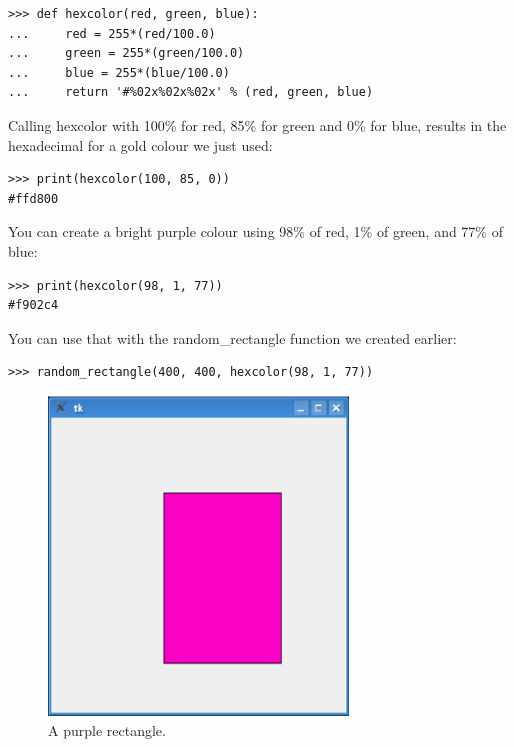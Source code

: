 \begin{listing}
\begin{verbatim}
>>> def hexcolor(red, green, blue):
...     red = 255*(red/100.0)
...     green = 255*(green/100.0)
...     blue = 255*(blue/100.0)
...     return '#%02x%02x%02x' % (red, green, blue)
\end{verbatim}
\end{listing}

Calling hexcolor with 100\% for red, 85\% for green and 0\% for blue, results in the hexadecimal for a gold colour we just used:

\begin{listing}
\begin{verbatim}
>>> print(hexcolor(100, 85, 0))
#ffd800
\end{verbatim}
\end{listing}

\noindent
You can create a bright purple colour using 98\% of red, 1\% of green, and 77\% of blue:

\begin{listing}
\begin{verbatim}
>>> print(hexcolor(98, 1, 77))
#f902c4
\end{verbatim}
\end{listing}

\noindent
You can use that with the random\_rectangle function we created earlier:

\begin{listing}
\begin{verbatim}
>>> random_rectangle(400, 400, hexcolor(98, 1, 77))
\end{verbatim}
\end{listing}

\begin{figure}
\begin{center}
\includegraphics[width=80mm]{eps/figure35.eps}
\end{center}
\caption{A purple rectangle.}\label{fig35}
\end{figure}

